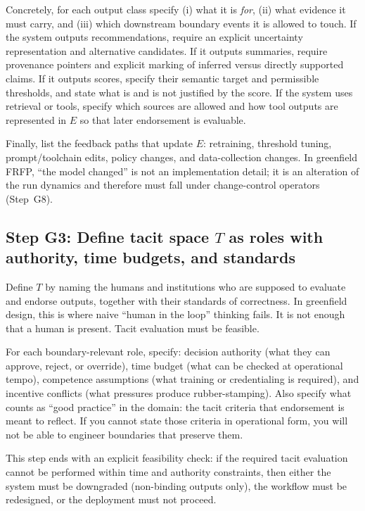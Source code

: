 Concretely, for each output class specify (i) what it is \emph{for}, (ii) what evidence it must carry, and (iii) which downstream boundary events it is allowed to touch. If the system outputs recommendations, require an explicit uncertainty representation and alternative candidates. If it outputs summaries, require provenance pointers and explicit marking of inferred versus directly supported claims. If it outputs scores, specify their semantic target and permissible thresholds, and state what is and is not justified by the score. If the system uses retrieval or tools, specify which sources are allowed and how tool outputs are represented in \(E\) so that later endorsement is evaluable.

Finally, list the feedback paths that update \(E\): retraining, threshold tuning, prompt/toolchain edits, policy changes, and data-collection changes. In greenfield FRFP, ``the model changed'' is not an implementation detail; it is an alteration of the run dynamics and therefore must fall under change-control operators (Step~G8).

\subsection{Step G3: Define tacit space \(T\) as roles with authority, time budgets, and standards}

Define \(T\) by naming the humans and institutions who are supposed to evaluate and endorse outputs, together with their standards of correctness. In greenfield design, this is where naive ``human in the loop'' thinking fails. It is not enough that a human is present. Tacit evaluation must be feasible.

For each boundary-relevant role, specify: decision authority (what they can approve, reject, or override), time budget (what can be checked at operational tempo), competence assumptions (what training or credentialing is required), and incentive conflicts (what pressures produce rubber-stamping). Also specify what counts as ``good practice'' in the domain: the tacit criteria that endorsement is meant to reflect. If you cannot state those criteria in operational form, you will not be able to engineer boundaries that preserve them.

This step ends with an explicit feasibility check: if the required tacit evaluation cannot be performed within time and authority constraints, then either the system must be downgraded (non-binding outputs only), the workflow must be redesigned, or the deployment must not proceed.

